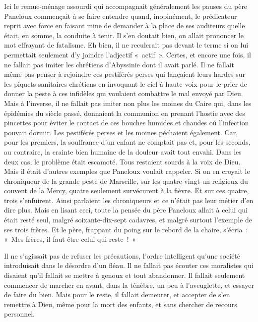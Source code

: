 \documentclass[french,twoside]{book} %
\begin{document}
Ici le remue-ménage assourdi qui accompagnait généralement les pauses du père Paneloux commençait à se faire entendre quand, inopinément, le prédicateur reprit avec force en faisant mine de demander à la place de ses auditeurs quelle était, en somme, la conduite à tenir. Il s’en doutait bien, on allait prononcer le mot effrayant de fatalisme. Eh bien, il ne reculerait pas devant le terme si on lui permettait seulement d’y joindre l’adjectif « actif ». Certes, et encore une fois, il ne fallait pas imiter les chrétiens d’Abyssinie dont il avait parlé. Il ne fallait même pas penser à rejoindre ces pestiférés perses qui lançaient leurs hardes sur les piquets sanitaires chrétiens en invoquant le ciel à haute voix pour le prier de donner la peste à ces infidèles qui voulaient combattre le mal envoyé par Dieu. Mais à l’inverse, il ne fallait pas imiter non plus les moines du Caire qui, dans les épidémies du siècle passé, donnaient la communion en prenant l’hostie avec des pincettes pour éviter le contact de ces bouches humides et chaudes où l’infection pouvait dormir. Les pestiférés perses et les moines péchaient également. Car, pour les premiers, la souffrance d’un enfant ne comptait pas et, pour les seconds, au contraire, la crainte bien humaine de la douleur avait tout envahi. Dans les deux cas, le problème était escamoté. Tous restaient sourds à la voix de Dieu. Mais il était d’autres exemples que Paneloux voulait rappeler. Si on en croyait le chroniqueur de la grande peste de Marseille, sur les quatre-vingt-un religieux du couvent de la Mercy, quatre seulement survécurent à la fièvre. Et sur ces quatre, trois s’enfuirent. Ainsi parlaient les chroniqueurs et ce n’était pas leur métier d’en dire plus. Mais en lisant ceci, toute la pensée du père Paneloux allait à celui qui était resté seul, malgré soixante-dix-sept cadavres, et malgré surtout l’exemple de ses trois frères. Et le père, frappant du poing sur le rebord de la chaire, s’écria : « Mes frères, il faut être celui qui reste ! »\par
Il ne s’agissait pas de refuser les précautions, l’ordre intelligent qu’une société introduisait dans le désordre d’un fléau. Il ne fallait pas écouter ces moralistes qui disaient qu’il fallait se mettre à genoux et tout abandonner. Il fallait seulement commencer de marcher en avant, dans la ténèbre, un peu à l’aveuglette, et essayer de faire du bien. Mais pour le reste, il fallait demeurer, et accepter de s’en remettre à Dieu, même pour la mort des enfants, et sans chercher de recours personnel.\par
\end{document}
